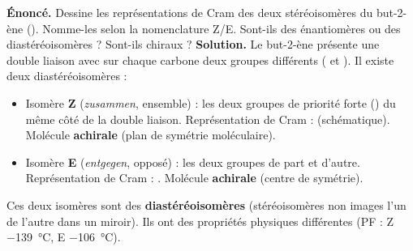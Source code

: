 \documentclass[11pt]{article}
\newcounter{popsec}
\newcounter{popsub}
\newcommand{\courssub}[1]{%
  \stepcounter{popsub}%
  \par\vspace{9pt}\noindent{\popxbold\fontsize{11.5}{13}\selectfont\color{popink}{\color{poporange}\thepopsec.\thepopsub}\hspace{6pt}#1}\par\nopagebreak\vspace{4pt}
}
\begin{document}
\begin{exoresolu}
\textbf{Énoncé.} Dessine les représentations de Cram des deux stéréoisomères du but-2-ène (). Nomme-les selon la nomenclature Z/E. Sont-ils des énantiomères ou des diastéréoisomères ? Sont-ils chiraux ?
\tcblower
\textbf{Solution.}
Le but-2-ène présente une double liaison  avec sur chaque carbone deux groupes différents ( et ). Il existe deux diastéréoisomères :
\begin{itemize}
\item Isomère \textbf{Z} (\emph{zusammen}, ensemble) : les deux groupes de priorité forte () du même côté de la double liaison. Représentation de Cram :  (schématique). Molécule \textbf{achirale} (plan de symétrie moléculaire).
\item Isomère \textbf{E} (\emph{entgegen}, opposé) : les deux groupes  de part et d'autre. Représentation de Cram : . Molécule \textbf{achirale} (centre de symétrie).
\end{itemize}
Ces deux isomères sont des \textbf{diastéréoisomères} (stéréoisomères non images l'un de l'autre dans un miroir). Ils ont des propriétés physiques différentes (PF : Z \SI{-139}{\celsius}, E \SI{-106}{\celsius}).
\end{exoresolu}

\courssub{Conclusion}
\end{document}
